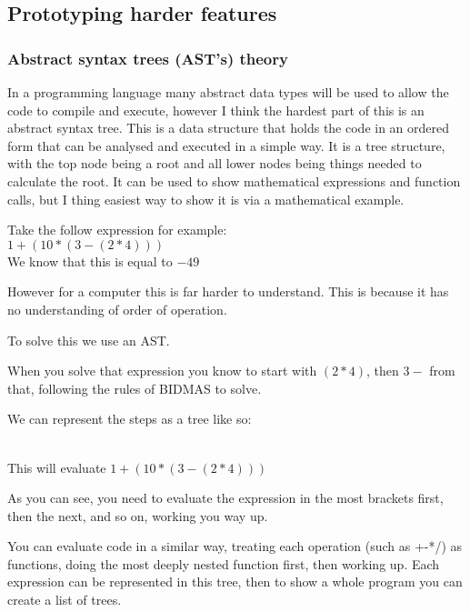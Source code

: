 \documentclass[a4paper,12pt]{article}
\begin{document}
{\subsection{Prototyping harder features}
\subsubsection{Abstract syntax trees (AST's) theory}
In a programming language many abstract data types will be used to allow the code 
to compile and execute, however I think the hardest part of this is an abstract 
syntax tree. This is a data structure that holds the code in an ordered form that 
can be analysed and  executed in a simple way. It is a tree structure, with the top 
node being a root and all lower nodes being things needed to calculate the root. It can 
be used to show mathematical expressions and function calls, but I thing easiest way to 
show it is via a mathematical example.

Take the follow expression for example:
\\

{\Large{\(1 + (10 * (3 - (2 * 4)))\)}}
\\

We know that this is equal to \(-49\)

However for a computer this is far harder to understand. This is because it has no 
understanding of order of operation.

To solve this we use an AST.

When you solve that expression you know to start with 
\((2 * 4)\), then \(3 -\) 
from that, following the rules of BIDMAS to solve.

We can represent the steps as a tree like so:

\\
This will evaluate \(1 + (10 * (3 - (2 * 4)))\)

As you can see, you need to evaluate the expression in the most brackets
first, then the next, and so on, working you way up.

You can evaluate code in a similar way, treating each operation (such as +-*/)
as functions, doing the most deeply nested function first, then working up. 
Each expression can be represented in this tree, then to show a whole program you 
can create a list of trees.

}
\end{document}
